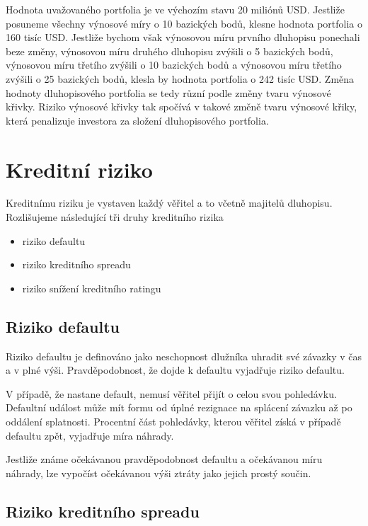 \documentclass[a4paper]{book}
\begin{document}
Hodnota uvažovaného portfolia je ve výchozím stavu 20 miliónů USD. Jestliže posuneme všechny výnosové míry o 10 bazických bodů, klesne hodnota portfolia o 160 tisíc USD. Jestliže bychom však výnosovou míru prvního dluhopisu ponechali beze změny, výnosovou míru druhého dluhopisu zvýšili o 5 bazických bodů, výnosovou míru třetího zvýšili o 10 bazických bodů a výnosovou míru třetího zvýšili o 25 bazických bodů, klesla by hodnota portfolia o 242 tisíc USD. Změna hodnoty dluhopisového portfolia se tedy různí podle změny tvaru výnosové křivky. Riziko výnosové křivky tak spočívá v takové změně tvaru výnosové křiky, která penalizuje investora za složení dluhopisového portfolia.

\section{Kreditní riziko}

Kreditnímu riziku je vystaven každý věřitel a to včetně majitelů dluhopisu. Rozlišujeme následující tři druhy kreditního rizika
\begin{itemize}
\item riziko defaultu
\item riziko kreditního spreadu
\item riziko snížení kreditního ratingu
\end{itemize}

\subsection{Riziko defaultu}

Riziko defaultu je definováno jako neschopnost dlužníka uhradit své závazky v čas a v plné výši. Pravděpodobnost, že dojde k defaultu vyjadřuje riziko defaultu.

V případě, že nastane default, nemusí věřitel přijít o celou svou pohledávku. Defaultní událost může mít formu od úplné rezignace na splácení závazku až po oddálení splatnosti. Procentní část pohledávky, kterou věřitel získá v případě defaultu zpět, vyjadřuje míra náhrady.

Jestliže známe očekávanou pravděpodobnost defaultu a očekávanou míru náhrady, lze vypočíst očekávanou výši ztráty jako jejich prostý součin.

\subsection{Riziko kreditního spreadu}
\end{document}
